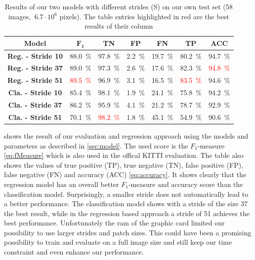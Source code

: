 \begin{table}[]
	\begin{center}
		\begin{tabular}{c|cccccc}
			\toprule
			\textbf{Model} & {\bf $\mathbf{F_1}$} & \textbf{TN} & \textbf{FP} & \textbf{FN} & \textbf{TP} & \textbf{ACC} \\
			\midrule
			\textbf{Reg. - Stride 10} & \SI{88.0}{\percent} & \SI{97.8}{\percent} & \SI{2.2}{\percent}& \SI{19.7}{\percent}& \SI{80.2}{\percent}& \SI{94.7}{\percent}\\
			\textbf{Reg. - Stride 37} & \SI{89.0}{\percent}& \SI{97.3}{\percent}& \SI{2.6}{\percent}& \SI{17.6}{\percent}& \SI{82.3}{\percent} &  \textcolor{red}{\SI{94.8}{\percent}}\\
			\textbf{Reg. - Stride 51} & \textcolor{red}{\SI{89.5}{\percent}} &\SI{96.9}{\percent} & \SI{3.1}{\percent} & \SI{16.5}{\percent}& \textcolor{red}{\SI{83.5}{\percent}} & \SI{94.6}{\percent}\\
			\midrule
			\textbf{Cla. - Stride 10} & \SI{85.4}{\percent} & \SI{98.1}{\percent}& \SI{1.9}{\percent}&\SI{24.1}{\percent} & \SI{75.8}{\percent} & \SI{94.2}{\percent}\\
			\textbf{Cla. - Stride 37} & \SI{86.2}{\percent}& \SI{95.9}{\percent} & \SI{4.1}{\percent} & \SI{21.2}{\percent} & \SI{78.7}{\percent} & \SI{92.9}{\percent}\\
			\textbf{Cla. - Stride 51} & \SI{70.1}{\percent} & \textcolor{red}{\SI{98.2}{\percent}} & \SI{1.8}{\percent} & \SI{45.1}{\percent} & \SI{54.9}{\percent} & \SI{90.6}{\percent}\\
			\bottomrule
		\end{tabular}
		\caption{Results of our two models with different strides (S) on our own test set (58 images, $ ~6.7 \cdot 10^6$ pixels). The table entries highlighted in red are the best results of their column}
		\label{tab:ownapproach}
	\end{center}
\end{table}

 shows the result of our evaluation and regression
approach using the models and parameters as described in \cref{sec:model}. The
used score is the $F_1$-measure \cref{eq:fMeasure} which is also used in the
offical KITTI evaluation. The table also shows the values of true positive (TP), true
negative (TN), false positive (FP), false negative (FN) and accuracy (ACC)
\cref{eq:accuracy}. It shows clearly that the regression model has an overall
better $F_1$-measure and accuracy score than the classification model.
Surprisingly, a smaller stride does not automatically lead to a better
performance. The classification model shows with a stride of the size 37
the best result, while in the regression based approach a stride of 51 achieves the best performance. 
Unfortunately the ram of the graphic card
limited our possibility to use larger strides and patch sizes. This could have been a promising
possibility to train and evaluate on a full image size and still keep our time
constraint and even enhance our performance.\\

